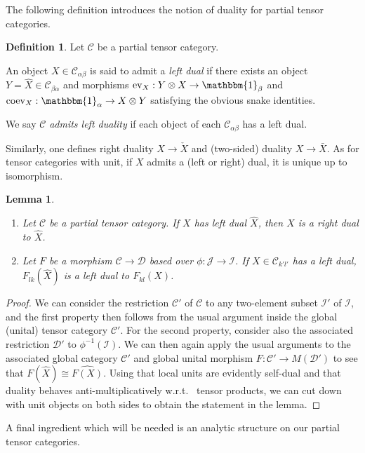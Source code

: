 \documentclass[10pt]{article}
\newcommand{\CatC}{\mathcal{C}}
\newcommand{\CatD}{\mathcal{D}}
\newcommand{\CatCC}{\mathscr{C}}
\newcommand{\CatDD}{\mathscr{D}}
\newcommand{\ev}{\mathrm{ev}}
\newcommand{\coev}{\mathrm{coev}}
\newcommand{\Unitb}{\mathbbm{1}}
\newtheorem{Lem}[Theorem]{Lemma}
\theoremstyle{definition}
\newtheorem{Def}[Theorem]{Definition}
\numberwithin{equation}{section}
\begin{document}
The following definition introduces the notion of duality for partial tensor categories.

\begin{Def} Let $\CatCC$ be a partial tensor category. 

An object $X\in \CatC_{\alpha\beta}$ is said to admit a \emph{left dual} if there exists an object $Y=\hat{X} \in \CatC_{\beta\alpha}$ and morphisms $\ev_{X}: Y\otimes X \rightarrow \Unitb_\beta$ and $\coev_X: \Unitb_\alpha\rightarrow X\otimes Y$ satisfying the obvious snake identities.

We say $\CatCC$ \emph{admits left duality} if each object of each $\CatC_{\alpha\beta}$ has a left dual.
\end{Def}

Similarly, one defines right duality $X\rightarrow \check{X}$ and (two-sided) duality $X\rightarrow \bar{X}$. As for tensor categories with unit, if $X$ admits a (left or right) dual, it is unique up to isomorphism. 

\begin{Lem}\label{LemMorDua}
\begin{enumerate}
\item Let $\CatCC$ be a partial tensor category. If $X$ has left dual $\hat{X}$, then $X$ is a right dual to $\hat{X}$. 
\item Let $F$ be a morphism $\CatCC\rightarrow \CatDD$ based over $\phi:\mathscr{J}\rightarrow \mathscr{I}$. If $X\in \CatC_{k'l'}$ has a left dual, $F_{lk}(\hat{X})$ is a left dual to $F_{kl}(X)$.
 \end{enumerate}
\end{Lem}
\begin{proof}
We can consider the restriction $\CatCC'$ of $\CatCC$ to any two-element subset $\mathscr{I}'$ of $\mathscr{I}$, and the first property then follows from the usual argument inside the global (unital) tensor category $\CatCC'$. For the second property, consider also the associated restriction $\mathscr{D}'$ to $\phi^{-1}(\mathscr{I})$. We can then again apply the usual arguments to the associated global category $\CatC'$ and global unital morphism $F:\CatC'\rightarrow M(\CatD')$ to see that $F(\hat{X})\cong \widehat{F(X)}$. Using that local units are evidently self-dual and that duality behaves anti-multiplicatively w.r.t.~ tensor products, we can cut down with unit objects on both sides to obtain the statement in the lemma.
\end{proof}

A final ingredient which will be needed is an analytic structure on our partial tensor categories.
\end{document}
